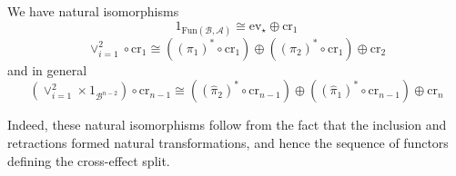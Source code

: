 \begin{lem}[label=lem:implNatIso]
    We have natural isomorphisms
    \begin{equation}\label{eq:nat1}
        1_{\text{Fun}(\mathcal{B},\mathcal{A})} \cong \text{ev}_\star \oplus \text{cr}_1
    \end{equation}
    \begin{equation}\label{eq:nat2}
        \lor_{i=1}^2\circ\text{cr}_1\cong ((\pi_1)^*\circ\text{cr}_1)\oplus ((\pi_2)^*\circ \text{cr}_1)\oplus \text{cr}_2
    \end{equation}
    and in general
    \begin{equation}\label{eq:natN}
        (\lor_{i=1}^2\times1_{\mathcal{B}^{n-2}})\circ \text{cr}_{n-1} \cong ((\hat{\pi}_2)^*\circ\text{cr}_{n-1})\oplus ((\hat{\pi}_1)^*\circ \text{cr}_{n-1})\oplus \text{cr}_n
    \end{equation}
\end{lem}

Indeed, these natural isomorphisms follow from the fact that the inclusion and retractions formed natural transformations, and hence the sequence of functors defining the cross-effect split.




